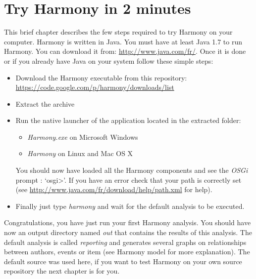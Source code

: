 \chapter{Try Harmony in 2 minutes}

This brief chapter describes the few steps required to try Harmony on your computer. Harmony is written in Java. You must have at least Java 1.7 to run Harmony. You can download it from: \url{http://www.java.com/fr/}. Once it is done or if you already have Java on your system follow these simple steps:
\begin{itemize}
	\item Download the Harmony executable from this repository: \\\url{https://code.google.com/p/harmony/downloads/list}
	\item Extract the archive
	\item Run the native launcher of the application located in the extracted folder:
		\begin{itemize}
			\item \emph{Harmony.exe} on Microsoft Windows
			\item \emph{Harmony} on Linux and Mac OS X
		\end{itemize}
	You should now have loaded all the Harmony components and see the \emph{OSGi} prompt : `osgi>'. If you have an error check that your path is correctly set (see \url{http://www.java.com/fr/download/help/path.xml} for help).	
	\item Finally just type \emph{harmony} and wait for the default analysis to be executed.
\end{itemize}

Congratulations, you have just run your first Harmony analysis. You should have now an output directory named \emph{out} that contains the results of this analysis. The default analysis is called \emph{reporting} and generates several graphs on relationships between authors, events or item (see Harmony model for more explanation). The default source was used here, if you want to test Harmony on your own source repository the next chapter is for you.
	



